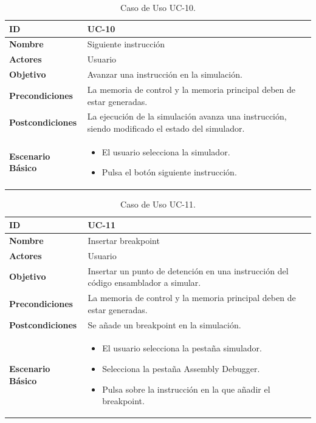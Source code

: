 \begin{center}
\begin{table}[htbp]
\centering
\begin{tabular}{@{}p{2.5cm} p{9cm}@{}} 
\toprule
\textbf{ID}	& UC-10  \\
\midrule
\textbf{Nombre} 		& Siguiente instrucción   \\
\midrule
\textbf{Actores} 		&	Usuario  \\
\midrule
\textbf{Objetivo} 	&	Avanzar una instrucción en la simulación.	 \\
\midrule
\textbf{Precondiciones}	&	La memoria de control y la memoria principal deben de estar generadas.  \\
\midrule
\textbf{Postcondiciones} 	& La ejecución de la simulación avanza una instrucción, siendo modificado el estado del simulador.   \\
\midrule
\textbf{Escenario Básico} 	&  \begin{itemize}
\item El usuario selecciona la simulador.
\item Pulsa el botón siguiente instrucción.
\end{itemize} \\
\bottomrule
\end{tabular}
\caption{Caso de Uso UC-10.}
\label{tab:uc10}
\end{table}
\end{center}

\begin{center}
\begin{table}[htbp]
\centering
\begin{tabular}{@{}p{2.5cm} p{9cm}@{}} 
\toprule
\textbf{ID}	& UC-11  \\
\midrule
\textbf{Nombre} 		& Insertar breakpoint  \\
\midrule
\textbf{Actores} 		&	Usuario  \\
\midrule
\textbf{Objetivo} 	&	Insertar un punto de detención en una instrucción del código ensamblador a simular.	 \\
\midrule
\textbf{Precondiciones}	&	La memoria de control y la memoria principal deben de estar generadas.  \\
\midrule
\textbf{Postcondiciones} 	& Se añade un breakpoint en la simulación.   \\
\midrule
\textbf{Escenario Básico} 	&  \begin{itemize}
\item El usuario selecciona la pestaña simulador.
\item Selecciona la pestaña Assembly Debugger.
\item Pulsa sobre la instrucción en la que añadir el breakpoint.
\end{itemize} \\
\bottomrule
\end{tabular}
\caption{Caso de Uso UC-11.}
\label{tab:uc11}
\end{table}
\end{center}

